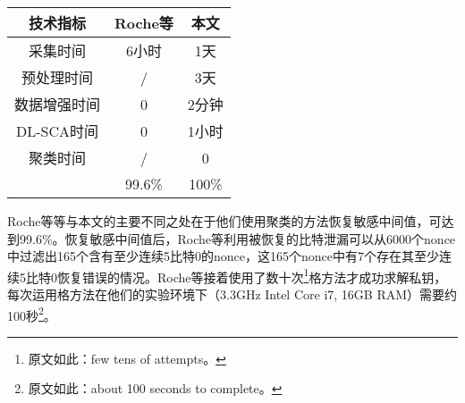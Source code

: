 {{{	\begin{table}[!h]
		\label{tab:improve}
		\centering
		\small%
		\begin{tabular}{ccc}
			\hline
			技术指标&Roche等\citep{Roche21}&本文\\
			\hline
			采集时间&6小时&1天\\
			预处理时间&/&3天\\
			数据增强时间&0&2分钟\\
			DL-SCA时间&0&1小时\\
			聚类时间&/&0\\
			\zyx&99.6\%&100\%\\
			\hline
		\end{tabular}
	\end{table}

	
	
	Roche等\citep{Roche21}等与本文的主要不同之处在于他们使用聚类的方法恢复敏感中间值，\zyx 可达到99.6\%。恢复敏感中间值后，Roche等\citep{Roche21}利用被恢复的比特泄漏可以从6000个nonce中过滤出165个含有至少连续5比特0的nonce，这165个nonce中有7个存在其至少连续5比特0恢复错误的情况。Roche等\citep{Roche21}接着使用了数十次\footnote{原文如此：few tens of attempts。}格方法才成功求解私钥，每次运用格方法在他们的实验环境下（3.3GHz Intel Core i7, 16GB RAM）需要约100秒\footnote{原文如此：about 100 seconds to complete。}。
	
	
}}}
